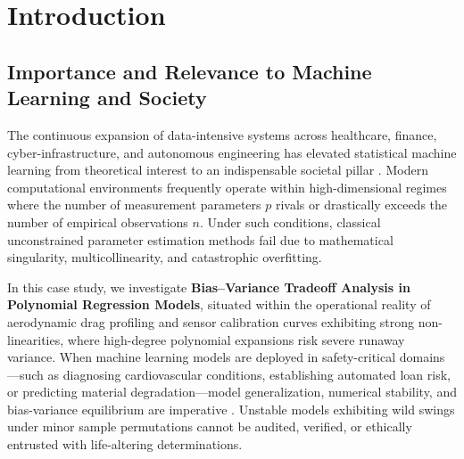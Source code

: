 \section{Introduction}

\subsection{Importance and Relevance to Machine Learning and Society}
The continuous expansion of data-intensive systems across healthcare, finance, cyber-infrastructure, and autonomous engineering has elevated statistical machine learning from theoretical interest to an indispensable societal pillar \cite{hastie2009}. Modern computational environments frequently operate within high-dimensional regimes where the number of measurement parameters $p$ rivals or drastically exceeds the number of empirical observations $n$. Under such conditions, classical unconstrained parameter estimation methods fail due to mathematical singularity, multicollinearity, and catastrophic overfitting.

In this case study, we investigate \textbf{Bias--Variance Tradeoff Analysis in Polynomial Regression Models}, situated within the operational reality of aerodynamic drag profiling and sensor calibration curves exhibiting strong non-linearities, where high-degree polynomial expansions risk severe runaway variance. When machine learning models are deployed in safety-critical domains---such as diagnosing cardiovascular conditions, establishing automated loan risk, or predicting material degradation---model generalization, numerical stability, and bias-variance equilibrium are imperative \cite{breiman2001}. Unstable models exhibiting wild swings under minor sample permutations cannot be audited, verified, or ethically entrusted with life-altering determinations.

